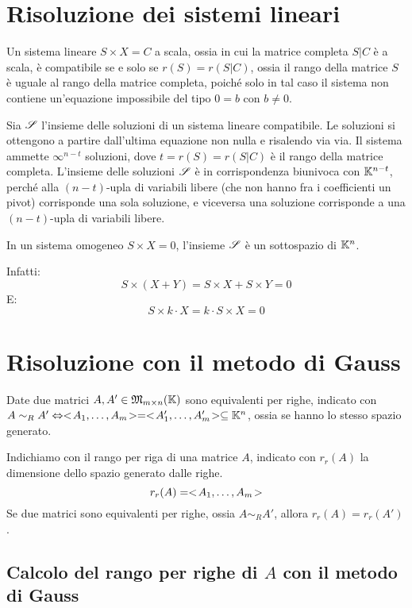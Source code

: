 \section{Risoluzione dei sistemi lineari}

Un sistema lineare $S \times X = C$ a scala, ossia in cui la matrice completa $S | C$ \`e a scala, \`e compatibile se e solo se $r(S) = r(S|C)$, ossia il rango della matrice $S$ \`e uguale al rango della matrice completa, poich\'e solo in tal caso il sistema non contiene un'equazione impossibile del tipo $0 = b$ con $b \neq 0$.

Sia $\mathscr{S}$ l'insieme delle soluzioni di un sistema lineare compatibile. Le soluzioni si ottengono a partire dall'ultima equazione non nulla e risalendo via via. Il sistema ammette $\infty^{n - t}$ soluzioni, dove $t = r(S) = r(S | C)$ \`e il rango della matrice completa. L'insieme delle soluzioni $\mathscr{S}$ \`e in corrispondenza biunivoca con $\mathbb{K}^{n - t}$, perch\'e alla $(n-t)$-upla di variabili libere (che non hanno fra i coefficienti un pivot) corrisponde una sola soluzione, e viceversa una soluzione corrisponde a una $(n-t)$-upla di variabili libere.

\begin{prop}
In un sistema omogeneo $S \times X = 0$, l'insieme $\mathscr{S}$ \`e un sottospazio di $\mathbb{K}^n$.
\end{prop}
Infatti:
\[
S \times (X + Y) = S \times X + S \times Y = 0
\]
E:
\[
S \times k \cdot X = k \cdot S \times X = 0
\]

\section{Risoluzione con il metodo di Gauss}

\begin{defn}
Date due matrici $A, A' \in \mathfrak{M}_{m \times n} (\mathbb{K})$ sono equivalenti per righe, indicato con $A \sim_{R} A' \Leftrightarrow <\!{A_1, \ldots, A_m}\!> = <\!{A_1', \ldots, A_m'}\!> \subseteq \mathbb{K}^n$, ossia se hanno lo stesso spazio generato.
\end{defn}

Indichiamo con il rango per riga di una matrice $A$, indicato con $r_r(A)$ la dimensione dello spazio generato dalle righe.
\[
r_r(A) = <\!{A_1, \ldots, A_m}\!>
\]
Se due matrici sono equivalenti per righe, ossia $A \sim_{R} A'$, allora $r_r(A) = r_r(A')$.

\subsection{Calcolo del rango per righe di $A$ con il metodo di Gauss}

